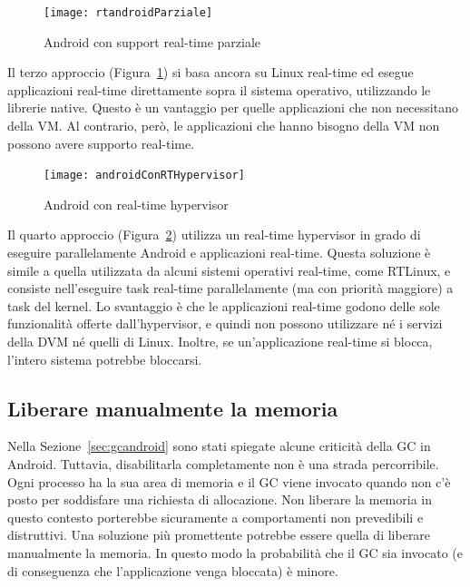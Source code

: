 \begin{figure}[h]
	\centering
	\texttt{[image: rtandroidParziale]}
	\caption{Android con support real-time parziale}
	\label{fig:rtandroidparziale}
\end{figure}
Il terzo approccio (Figura~\ref{fig:rtandroidparziale}) si basa ancora su Linux real-time ed esegue applicazioni real-time direttamente sopra il sistema operativo, utilizzando le librerie native. Questo è un vantaggio per quelle applicazioni che non necessitano della VM. Al contrario, però, le applicazioni che hanno bisogno della VM non possono avere supporto real-time.

\begin{figure}[h]
	\centering
	\texttt{[image: androidConRTHypervisor]}
	\caption{Android con real-time hypervisor}
	\label{fig:androidconrthypervisor}
\end{figure}
Il quarto approccio (Figura~\ref*{fig:androidconrthypervisor}) utilizza un real-time hypervisor in grado di eseguire parallelamente Android e applicazioni real-time. Questa soluzione è simile a quella utilizzata da alcuni sistemi operativi real-time, come RTLinux, e consiste nell'eseguire task real-time parallelamente (ma con priorità maggiore) a task del kernel. Lo svantaggio è che le applicazioni real-time godono delle sole funzionalità offerte dall'hypervisor, e quindi non possono utilizzare né i servizi della DVM né quelli di Linux. Inoltre, se un'applicazione real-time si blocca, l'intero sistema potrebbe bloccarsi.

\subsection{Liberare manualmente la memoria}
Nella Sezione~\ref{sec:gcandroid} sono stati spiegate alcune criticità della GC in Android. Tuttavia, disabilitarla completamente non è una strada percorribile. Ogni processo ha la sua area di memoria e il GC viene invocato quando non c'è posto per soddisfare una richiesta di allocazione. Non liberare la memoria in questo contesto porterebbe sicuramente a comportamenti non prevedibili e distruttivi. Una soluzione più promettente potrebbe essere quella di liberare manualmente la memoria. In questo modo la probabilità che il GC sia invocato (e di conseguenza che l'applicazione venga bloccata) è minore. 

